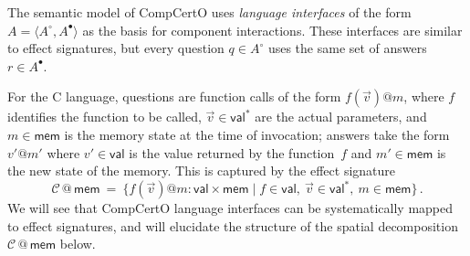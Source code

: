 \documentclass[acmsmall,nonacm]{acmart}
\newcommand{\kw}[1]{\ensuremath{ \mathsf{#1} }}
\begin{document}
\begin{example} \label{ex:compcertosig} %
The semantic model of CompCertO uses \emph{language interfaces}
of the form $A = \langle A^\circ, A^\bullet \rangle$
as the basis for component interactions.
These interfaces are similar to effect signatures,
but every question $q \in A^\circ$ uses the same set of answers $r \in A^\bullet$.

For the C language,
questions are function calls of the form $f(\vec{v})@m$, where
$f$ identifies the function to be called,
$\vec{v} \in \kw{val}^*$ are the actual parameters, and
$m \in \kw{mem}$ is the memory state at the time of invocation;
answers take the form $v'@m'$ where
$v' \in \kw{val}$ is the value returned by the function~$f$ and
$m' \in \kw{mem}$ is the new state of the memory.
This is captured by the effect signature
\[
  \mathcal{C} \mathbin@ \kw{mem} \:=\:
  \{ f(\vec{v})@m \mathbin: \kw{val} \times \kw{mem} \mid
     f \in \kw{val}, \:
     \vec{v} \in \kw{val}^*, \:
     m \in \kw{mem} \}
  \,.
\]
We will see that CompCertO language interfaces
can be systematically mapped to effect signatures,
and will elucidate the structure of
the spatial decomposition $\mathcal{C} \mathbin@ \kw{mem}$ below.
\end{example}

\end{document}
